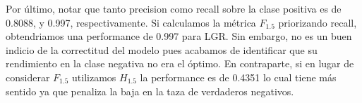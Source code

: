 Por último, notar que tanto precision como recall sobre la clase positiva
es de 0.8088, y 0.997, respectivamente. Si calculamos la métrica $F_{1.5}$ priorizando recall, obtendriamos una performance de 0.997 para LGR. Sin embargo,
no es un buen indicio de la correctitud del modelo pues acabamos de identificar que su rendimiento en la clase negativa no era el óptimo. En contraparte, si en lugar de considerar $F_{1.5}$ utilizamos $H_{1.5}$ la performance es de 0.4351 lo cual tiene más sentido ya que penaliza la baja en la taza de verdaderos negativos.

\begin{table}[h!]
\centering
{}
 \caption{Resultados por esquema de acción del mejor modelo con codificación por word embeddings.}
 \label{results:ad-hoc-calibrate}
\end{table}

